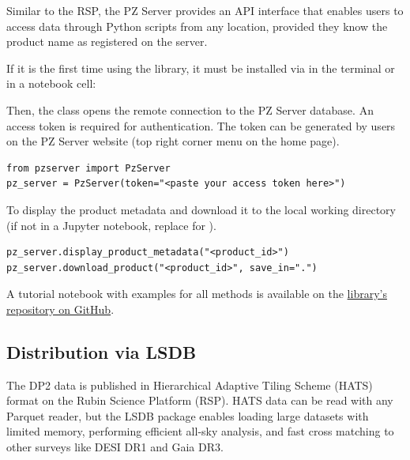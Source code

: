 Similar to the RSP, the PZ Server provides an API interface that enables users to access data through Python scripts from any location, provided they know the product name as registered on the server.

If it is the first time using the library, it must be installed via  in the terminal or in a notebook cell: 

Then, the  class opens the remote connection to the PZ Server database. An access token is required for authentication. The token can be generated by users on the PZ Server website (top right corner menu on the home page).

\begin{verbatim}
from pzserver import PzServer
pz_server = PzServer(token="<paste your access token here>")
\end{verbatim}

To display the product metadata and download it to the local working directory (if not in a Jupyter notebook, replace  for ).
\begin{verbatim}
pz_server.display_product_metadata("<product_id>")
pz_server.download_product("<product_id>", save_in=".")
\end{verbatim}





A tutorial notebook with examples for all  methods is available on the \href{https://github.com/linea-it/pzserver/blob/main/docs/notebooks/pzserver_tutorial.ipynb}{ library's repository on GitHub}.


\subsection{Distribution via LSDB}
\label{sec:distribution:lsdb}

The DP2 data is published in Hierarchical Adaptive Tiling Scheme (HATS) format on the Rubin Science Platform (RSP). HATS data can be read with any Parquet reader, but
the LSDB package \citep{2025arXiv250102103C} enables loading large datasets with limited memory, performing efficient all-sky analysis, and fast cross matching to other surveys like DESI DR1 and Gaia DR3.


